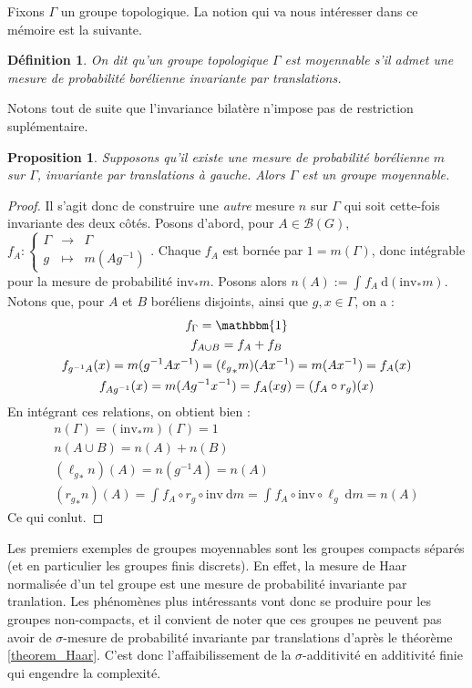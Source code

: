 \documentclass[a4paper,12pt]{article}
\newtheorem{proposition}[theorem]{Proposition}
\newtheorem{definition}[theorem]{Définition}
\newcommand{\Bor}{\mathcal{B}}
\newcommand{\indic}{\mathbbm{1}}
\newcommand{\integral}[4]{\int_{#1}^{#2} #3~\mathrm{d}#4}
\newcommand\fundef[3]{#1: \left\{\begin{array}{ccc}#2\\#3\end{array}\right.}
\newcommand{\inv}{^{-1}}
\newcommand{\comp}{\circ}
\newcommand{\invop}{\mathrm{inv}}
\begin{document}
Fixons $\Gamma$ un groupe topologique. La notion qui va nous intéresser dans ce mémoire est la suivante.

\begin{definition}
    On dit qu'un groupe topologique $\Gamma$ est \emph{moyennable} s'il admet une 
    mesure de probabilité borélienne invariante par translations.
\end{definition}

Notons tout de suite que l'invariance bilatère n'impose pas de restriction suplémentaire. 
\begin{proposition}\label{bilateral_of_left}
    Supposons qu'il existe une mesure de probabilité borélienne $m$ sur $\Gamma$, invariante par translations \emph{à gauche}.
    Alors $\Gamma$ est un groupe moyennable.
\end{proposition} 

\begin{proof}
    Il s'agit donc de construire une \emph{autre} mesure $n$ sur $\Gamma$ qui soit cette-fois invariante des deux côtés.
    Posons d'abord, pour $A\in\Bor(G)$, $\fundef{f_A}{\Gamma&\to& \Gamma}{g&\mapsto& m(Ag\inv)}$. Chaque $f_A$ est bornée par $1 = m(\Gamma)$, 
    donc intégrable pour la mesure de probabilité $\invop_*m$. Posons alors $n(A) := \integral{}{}{f_A}{(\invop_*m)}$. \\
    Notons que, pour $A$ et $B$ boréliens disjoints, ainsi que $g, x\in\Gamma$, on a :
    \begin{gather*}
        f_\Gamma = \indic \\
        f_{A\cup B} = f_A + f_B \\
        f_{g\inv A}(x) = m(g\inv Ax\inv) = ({\ell_g}_*m)(Ax\inv) = m(Ax\inv) = f_A(x) \\
        f_{Ag\inv}(x) = m(Ag\inv x\inv) = f_A(xg) = (f_A \comp r_g)(x)
    \end{gather*}
    En intégrant ces relations, on obtient bien :
    \begin{gather*}
        n(\Gamma) = (\invop_*m)(\Gamma) = 1 \\
        n(A\cup B) = n(A) + n(B) \\
        ({\ell_g}_*n)(A) = n(g\inv A) = n(A) \\
        ({r_g}_*n)(A) = \integral{}{}{f_A\comp r_g\comp\invop}{m} = \integral{}{}{f_A\comp\invop\comp \ell_g}{m} = n(A)
    \end{gather*}
    Ce qui conlut.
\end{proof}

Les premiers exemples de groupes moyennables sont les groupes compacts séparés (et en particulier les groupes finis discrets).
En effet, la mesure de Haar normalisée d'un tel groupe est une mesure de probabilité invariante par tranlation. Les phénomènes
plus intéressants vont donc se produire pour les groupes non-compacts, et il convient de noter que ces groupes ne peuvent pas avoir
de $\sigma$-mesure de probabilité invariante par translations d'après le théorème \ref{theorem_Haar}. C'est donc l'affaibilissement de la 
$\sigma$-additivité en additivité finie qui engendre la complexité. 
\end{document}
